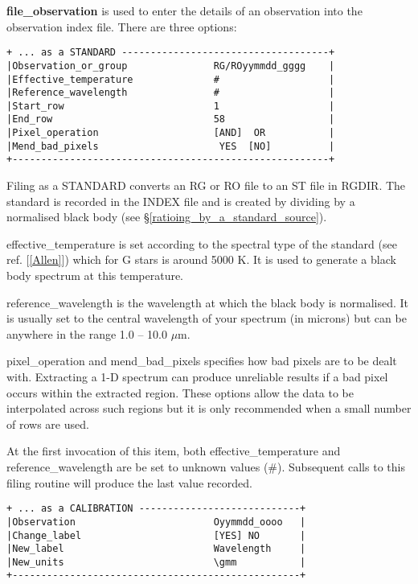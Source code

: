 {{\bf file\_observation} is used to enter the details of an observation 
into the observation index file. There are three options:

\begin{verbatim}
+ ... as a STANDARD ------------------------------------+
|Observation_or_group               RG/ROyymmdd_gggg    |
|Effective_temperature              #                   |
|Reference_wavelength               #                   |
|Start_row                          1                   |
|End_row                            58                  |
|Pixel_operation                    [AND]  OR           |
|Mend_bad_pixels                     YES  [NO]          |
+-------------------------------------------------------+
\end{verbatim}

Filing as a {\sf STANDARD} converts an RG or RO file to an ST file in RGDIR.
The standard is recorded in the INDEX file and is created by dividing 
by a normalised black body (see \S \ref{ratioing_by_a_standard_source}).

{\sf effective\_temperature} is set according to the spectral type of the
standard (see ref. [\ref{Allen}]) which for G stars is around 5000 K.
It is used to generate a black body spectrum at this temperature.

{\sf reference\_wavelength} is the wavelength at which the black body is
normalised. It is usually set to the central wavelength of your spectrum
(in microns) but can be anywhere in the range 1.0 -- 10.0 $\mu$m. 

{\sf pixel\_operation} and {\sf mend\_bad\_pixels} specifies how bad pixels
are to be dealt with. Extracting a 1-D spectrum can produce unreliable
results if a bad pixel occurs within the extracted region. These options
allow the data to be interpolated across such regions but it is only
recommended when a small number of rows are used.

At the first invocation of this item, both {\sf effective\_temperature}
and {\sf reference\_wavelength} are be set to unknown values ({\sf \#}).
Subsequent calls to this filing routine will produce the last value recorded.

\begin{verbatim}
+ ... as a CALIBRATION ----------------------------+
|Observation                        Oyymmdd_oooo   |
|Change_label                       [YES] NO       |
|New_label                          Wavelength     |
|New_units                          \gmm           |
+--------------------------------------------------+
\end{verbatim}

}
